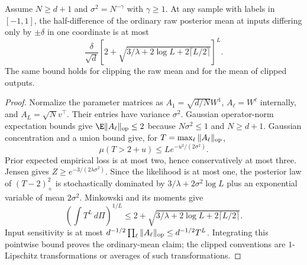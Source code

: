 \begin{lemma}
\label{lem:all-canonical-moments}
Assume $N\ge d+1$ and $\sigma^2=N^{-\gamma}$ with $\gamma\ge1$. At any sample with labels in $[-1,1]$, the half-difference of the ordinary raw posterior mean at inputs differing only by $\pm\delta$ in one coordinate is at most
\[
 \frac\delta{\sqrt d}
 \left[2+\sqrt{3/\lambda+2\log L+2\lceil L/2\rceil}\right]^L.
\]
The same bound holds for clipping the raw mean and for the mean of clipped outputs.
\end{lemma}
\begin{proof}
Normalize the parameter matrices as
$A_1=\sqrt{d/N}W^1$, $A_\ell=W^\ell$ internally, and $A_L=\sqrt N v^\top$.
Their entries have variance $\sigma^2$. Gaussian operator-norm expectation bounds give $\E\|A_\ell\|_{\rm op}\le2$ because $N\sigma^2\le1$ and $N\ge d+1$. Gaussian concentration and a union bound give, for $T=\max_\ell\|A_\ell\|_{\rm op}$,
\[
 \mu(T>2+u)\le L e^{-u^2/(2\sigma^2)}.
\]
Prior expected empirical loss is at most two, hence conservatively at most three. Jensen gives $Z\ge e^{-3/(2\lambda\sigma^2)}$. Since the likelihood is at most one, the posterior law of $(T-2)_+^2$ is stochastically dominated by $3/\lambda+2\sigma^2\log L$ plus an exponential variable of mean $2\sigma^2$. Minkowski and its moments give
\[
 \left(\int T^L\,d\Pi\right)^{1/L}
 \le2+\sqrt{3/\lambda+2\log L+2\lceil L/2\rceil}.
\]
Input sensitivity is at most $d^{-1/2}\prod_\ell\|A_\ell\|_{\rm op}\le d^{-1/2}T^L$. Integrating this pointwise bound proves the ordinary-mean claim; the clipped conventions are $1$-Lipschitz transformations or averages of such transformations.
\end{proof}

